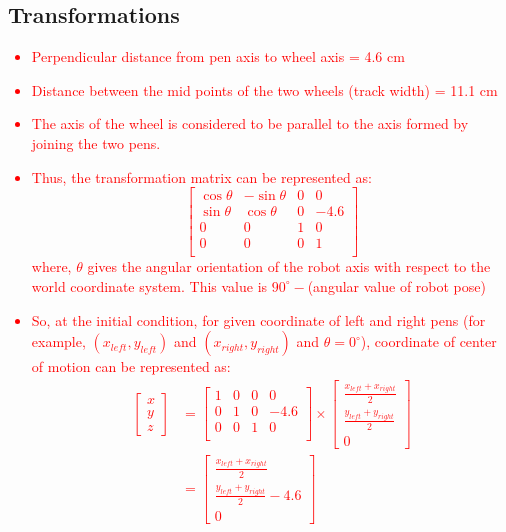 \documentclass[10pt,a4paper]{article}
\begin{document}
			\subsection{Transformations}\textcolor{red}{
				\begin{itemize}
					\item Perpendicular distance from pen axis to wheel axis = 4.6 cm
					\item Distance between the mid points of the two wheels (track width) = 11.1 cm
					\item The axis of the wheel is considered to be parallel to the axis formed by joining the two pens.
					\item Thus, the transformation matrix can be represented as:
					$$
					\begin{bmatrix}
						\cos\theta & -\sin\theta & 0 & 0 \\
						\sin\theta &\cos\theta & 0 & -4.6 \\
						0 & 0 & 1 & 0 \\
						0 & 0 & 0 & 1 \\
					\end{bmatrix}					
					$$
					where, $\theta$ gives the angular orientation of the robot axis with respect to the world coordinate system. This value is $90^\circ-$(angular value of robot pose) 
					\item So, at the initial condition, for given coordinate of left and right pens (for example, $(x_{left},y_{left})$ and $(x_{right},y_{right})$ and $\theta = 0^\circ$), coordinate of center of motion can be represented as:
					\begin{align*}
					\begin{bmatrix}
					x\\y\\z
					\end{bmatrix} &=
									\begin{bmatrix}
									1 & 0 & 0 & 0 \\
									0 & 1 & 0 & -4.6 \\
									0 & 0 & 1 & 0 \\
									\end{bmatrix} 
										\times
									\begin{bmatrix}
									\frac{x_{left}+x_{right}}{2}\\\frac{y_{left}+y_{right}}{2}\\0
									\end{bmatrix}\\\
								&=\begin{bmatrix}
								\frac{x_{left}+x_{right}}{2}\\\frac{y_{left}+y_{right}}{2}-4.6	\\0
								\end{bmatrix}											
					\end{align*}
				\end{itemize}
			}
\end{document}
